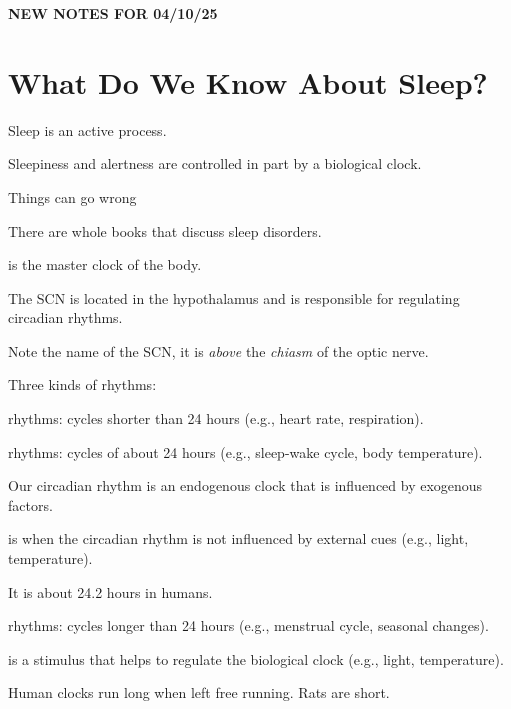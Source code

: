\begin{center}
    \textbf{NEW NOTES FOR 04/10/25} \\
    \hrulefill
\end{center}

\section{What Do We Know About Sleep?}

\begin{coloredlist}
    \item Sleep is an active process.
    \item Sleepiness and alertness are controlled in part by a biological clock.
    \item Things can go wrong
    \begin{coloredlist}
        \item There are whole books that discuss sleep disorders.
    \end{coloredlist}
    \item {} is the master clock of the body.
    \begin{coloredlist}
        \item The SCN is located in the hypothalamus and is responsible for regulating circadian rhythms.
        \item Note the name of the SCN, it is \textit{above} the \textit{chiasm} of the optic nerve.
    \end{coloredlist}
    \item Three kinds of rhythms:
    \begin{coloredlist}
        \item {} rhythms: cycles shorter than 24 hours (e.g., heart rate, respiration).
        \item {} rhythms: cycles of about 24 hours (e.g., sleep-wake cycle, body temperature).
        \begin{coloredlist}
            \item Our circadian rhythm is an endogenous clock that is influenced by exogenous factors.
            \item {} is when the circadian rhythm is not influenced by external cues (e.g., light, temperature).
            \item It is about 24.2 hours in humans.
        \end{coloredlist}
        \item {} rhythms: cycles longer than 24 hours (e.g., menstrual cycle, seasonal changes).
    \end{coloredlist}
    \item {} is a stimulus that helps to regulate the biological clock (e.g., light, temperature).
    \item Human clocks run long when left free running. Rats are short.
\end{coloredlist}

